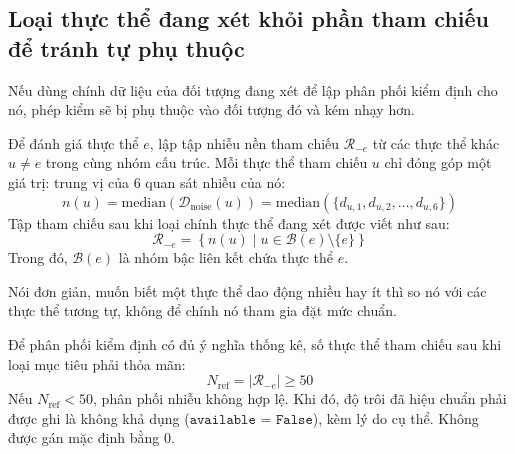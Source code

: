 \subsection{Loại thực thể đang xét khỏi phần tham chiếu để tránh tự phụ thuộc}
Nếu dùng chính dữ liệu của đối tượng đang xét để lập phân phối kiểm định cho nó, phép kiểm sẽ bị phụ thuộc vào đối tượng đó và kém nhạy hơn.

\begin{definition}
Để đánh giá thực thể $e$, lập tập nhiễu nền tham chiếu $\mathcal{R}_{-e}$ từ các thực thể khác $u \neq e$ trong cùng nhóm cấu trúc. Mỗi thực thể tham chiếu $u$ chỉ đóng góp một giá trị: trung vị của 6 quan sát nhiễu của nó:
\begin{equation}
n(u) = \text{median}\left( \mathcal{D}_{\text{noise}}(u) \right) = \text{median}\left( \{d_{u, 1}, d_{u, 2}, \dots, d_{u, 6}\} \right)
\label{eq:entity_null_median}
\end{equation}
Tập tham chiếu sau khi loại chính thực thể đang xét được viết như sau:
\begin{equation}
\mathcal{R}_{-e} = \left\{ n(u) \mid u \in \mathcal{B}(e) \setminus \{e\} \right\}
\label{eq:lto_reference_set}
\end{equation}
Trong đó, $\mathcal{B}(e)$ là nhóm bậc liên kết chứa thực thể $e$.
\end{definition}
Nói đơn giản, muốn biết một thực thể dao động nhiều hay ít thì so nó với các thực thể tương tự, không để chính nó tham gia đặt mức chuẩn.
\begin{axiom}
Để phân phối kiểm định có đủ ý nghĩa thống kê, số thực thể tham chiếu sau khi loại mục tiêu phải thỏa mãn:
\begin{equation}
N_{\text{ref}} = |\mathcal{R}_{-e}| \ge 50
\end{equation}
Nếu $N_{\text{ref}} < 50$, phân phối nhiễu không hợp lệ. Khi đó, độ trôi đã hiệu chuẩn phải được ghi là không khả dụng ($\texttt{available = False}$), kèm lý do cụ thể. Không được gán mặc định bằng 0.
\end{axiom}

